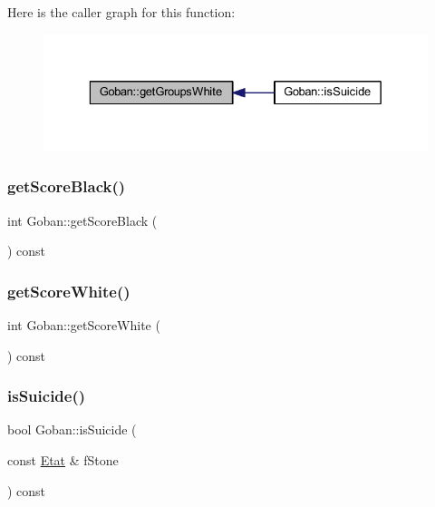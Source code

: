 Here is the caller graph for this function\+:
\nopagebreak
\begin{figure}[H]
\begin{center}
\leavevmode
\includegraphics[width=329pt]{class_goban_a0d5ecea357ff85e7d08f2c0855d83e6b_icgraph}
\end{center}
\end{figure}
\mbox{\label{class_goban_aa8e21b5f8d033ce312c8001e3483efa4}} 
\subsubsection{\texorpdfstring{get\+Score\+Black()}{getScoreBlack()}}
{\footnotesize\ttfamily int Goban\+::get\+Score\+Black (\begin{DoxyParamCaption}{ }\end{DoxyParamCaption}) const}

\mbox{\label{class_goban_a424e710954cc8fda4baa1ebdb02a5441}} 
\subsubsection{\texorpdfstring{get\+Score\+White()}{getScoreWhite()}}
{\footnotesize\ttfamily int Goban\+::get\+Score\+White (\begin{DoxyParamCaption}{ }\end{DoxyParamCaption}) const}

\mbox{\label{class_goban_a8b95ea2b51c078381562e361ff7febac}} 
\subsubsection{\texorpdfstring{is\+Suicide()}{isSuicide()}}
{\footnotesize\ttfamily bool Goban\+::is\+Suicide (\begin{DoxyParamCaption}\item[{const \hyperlink{class_etat}{Etat} \&}]{f\+Stone }\end{DoxyParamCaption}) const}

